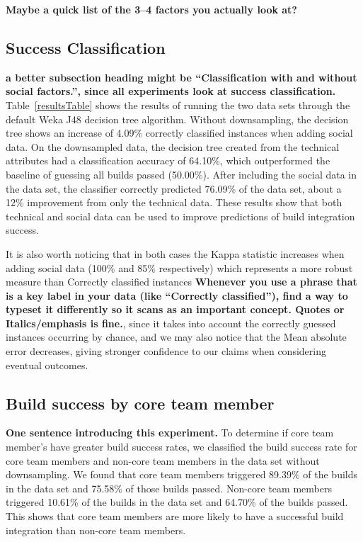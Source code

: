 \documentclass[10pt, conference]{IEEEtran}
\newcommand{\todo}[1]
  {{\scriptsize \textbf{\color{red} {#1}}}}
\begin{document}
\todo{Maybe a quick list of the 3--4 factors you actually look at?}

\subsection{Success Classification}

\todo{a better subsection heading might be ``Classification with and without
  social factors.'', since all experiments look at success classification.}
Table~\ref{resultsTable} shows the results of running the two data sets through the
default Weka J48 decision tree algorithm.  Without downsampling, the 
decision tree shows an increase of 4.09\% correctly classified instances when adding social data. On the downsampled data, the decision tree created from the technical attributes
had a classification accuracy of 64.10\%, which outperformed the baseline of
guessing all builds passed (50.00\%).
 After including the social data
in the data set, the classifier correctly predicted 76.09\% of the data set,
about a 12\% improvement from only the technical data.  These results show that
both technical and social data can be used to improve predictions of build 
integration success.

It is also worth noticing that in both cases the Kappa statistic increases when
adding social data (100\% and 85\% respectively) which represents a more robust
measure than Correctly classified instances\todo{Whenever you use a phrase that
  is a key label in your data (like ``Correctly classified''), find a way to
  typeset it differently so it scans as an important concept.  Quotes or Italics/emphasis
  is fine.}, since it takes into account the
correctly guessed instances occurring by chance, and we may also notice that the
Mean absolute error decreases, giving stronger confidence to our claims when
considering eventual outcomes. 

\subsection{Build success by core team member}

\todo{One sentence introducing this experiment.}
To determine if core team member's have greater build success rates,
we classified the build success rate for
core team members and non-core team members in the data set without 
downsampling.  We found that core team members
triggered 89.39\% of the builds in the data set and 75.58\% of those builds
passed.  Non-core team members triggered 10.61\% of the builds in the data set
and 64.70\% of the builds passed.  This shows that core team members are more
likely to have a successful build integration than non-core team members.
\end{document}
